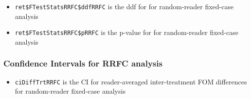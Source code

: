 \documentclass[]{book}
\newenvironment{Shaded}{\begin{snugshade}}{\end{snugshade}}
\newcommand{\CommentTok}[1]{\textcolor[rgb]{0.56,0.35,0.01}{\textit{#1}}}
\newcommand{\NormalTok}[1]{#1}
\newcommand{\OperatorTok}[1]{\textcolor[rgb]{0.81,0.36,0.00}{\textbf{#1}}}
\providecommand{\tightlist}{%
  \setlength{\itemsep}{0pt}\setlength{\parskip}{0pt}}
\begin{document}
\begin{itemize}
\tightlist
\item
  \texttt{ret\$FTestStatsRRFC\$ddfRRFC} is the ddf for for random-reader fixed-case analysis
\end{itemize}

\begin{Shaded}
\end{Shaded}

\begin{itemize}
\tightlist
\item
  \texttt{ret\$FTestStatsRRFC\$pRRFC} is the p-value for for random-reader fixed-case analysis
\end{itemize}

\begin{Shaded}
\end{Shaded}

\hypertarget{confidence-intervals-for-rrfc-analysis}{%
\subsubsection{Confidence Intervals for RRFC analysis}\label{confidence-intervals-for-rrfc-analysis}}

\begin{itemize}
\tightlist
\item
  \texttt{ciDiffTrtRRFC} is the CI for reader-averaged inter-treatment FOM differences for random-reader fixed-case analysis
\end{itemize}

\begin{Shaded}
\end{Shaded}
\end{document}
